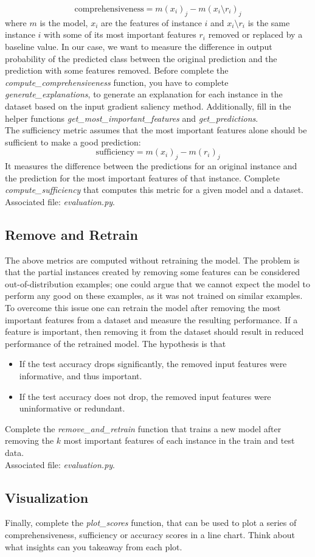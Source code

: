 \documentclass[a4paper]{article}
\begin{document}
\begin{equation}
    \text{comprehensiveness} = m(x_i)_j - m(x_i \setminus r_i)_j
\end{equation}
where $m$ is the model, $x_i$ are the features of instance $i$ and $x_i \setminus r_i$ is the same instance $i$ with some of its most important features $r_i$ removed or replaced by a baseline value.
In our case, we want to measure the difference in output probability of the predicted class between the original prediction and the prediction with some features removed.
Before complete the \textit{compute\_comprehensiveness} function, you have to complete \textit{generate\_explanations}, to generate an explanation for each instance in the dataset based on the input gradient saliency method.
Additionally, fill in the helper functions \textit{get\_most\_important\_features} and \textit{get\_predictions}.\\

The sufficiency metric assumes that the most important features alone should be sufficient to make a good prediction:
\begin{equation}
    \text{sufficiency} = m(x_i)_j - m(r_i)_j
\end{equation}
It measures the difference between the predictions for an original instance and the prediction for the most important features of that instance.
Complete \textit{compute\_sufficiency} that computes this metric for a given model and a dataset.
\\

\noindent Associated file: \textit{evaluation.py}.



\noindent
\subsection*{Remove and Retrain}
The above metrics are computed without retraining the model.
The problem is that the partial instances created by removing some features can be considered out-of-distribution examples; one could argue that we cannot expect the model to perform any good on these examples, as it was not trained on similar examples.
To overcome this issue one can retrain the model after removing the most important features from a dataset and measure the resulting performance.
If a feature is important, then removing it from the dataset should result in reduced performance of the retrained model.
The hypothesis is that
\begin{itemize}
    \item If the test accuracy drops significantly, the removed input features were informative, and thus important.
    \item If the test accuracy does not drop, the removed input features were uninformative or redundant.
\end{itemize}
Complete the \textit{remove\_and\_retrain} function that trains a new model after removing the $k$ most important features of each instance in the train and test data.
\\

\noindent Associated file: \textit{evaluation.py}.

\subsection*{Visualization}
Finally, complete the \textit{plot\_scores} function, that can be used to plot a series of comprehensiveness, sufficiency or accuracy scores in a line chart.
Think about what insights can you takeaway from each plot.
\end{document}
